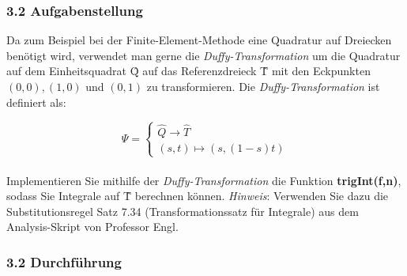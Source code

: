 \documentclass[a4paper,11pt,bibliography=totoc,listof=totoc,headinclude=true,cleardoublepage=empty,oneside]{scrbook}
\begin{document}


\subsubsection{3.2 Aufgabenstellung}
Da zum Beispiel bei der Finite-Element-Methode eine Quadratur auf Dreiecken benötigt wird, verwendet man gerne die \textit{Duffy-Transformation} um die Quadratur auf dem Einheitsquadrat \^{Q} auf das Referenzdreieck \^{T} mit den Eckpunkten $ (0,0),(1,0)$ und $ (0,1)$ zu transformieren.
Die \textit{Duffy-Transformation} ist definiert als:

\begin{equation}\label{equ:duffy}
\Psi = \begin{cases} 
\hat{Q} \to \hat{T} \\
(s,t) \mapsto (s,(1-s)t)
\end{cases} 
\end{equation} 
\\
Implementieren Sie mithilfe der \textit{Duffy-Transformation} die Funktion \textbf{trigInt(f,n)}, sodass Sie Integrale auf \^{T} berechnen können.
\textit{Hinweis}: Verwenden Sie dazu die Substitutionsregel Satz 7.34 (Transformationssatz für Integrale) aus dem Analysis-Skript von Professor Engl.


\subsubsection{3.2 Durchführung}
\vspace{0.5cm}
\setlength{\fboxsep}{1em}
\vspace{0.5cm}
		
\end{document}
